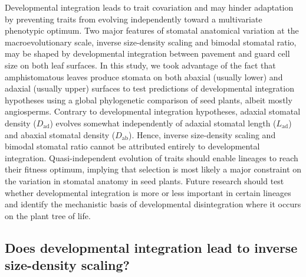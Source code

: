 \documentclass[
  10pt,
]{article}
\begin{document}
Developmental integration leads to trait covariation and may hinder adaptation by preventing traits from evolving independently toward a multivariate phenotypic optimum. Two major features of stomatal anatomical variation at the macroevolutionary scale, inverse size-density scaling and bimodal stomatal ratio, may be shaped by developmental integration between pavement and guard cell size on both leaf surfaces. In this study, we took advantage of the fact that amphistomatous leaves produce stomata on both abaxial (usually lower) and adaxial (usually upper) surfaces to test predictions of developmental integration hypotheses using a global phylogenetic comparison of seed plants, albeit mostly angiosperms. Contrary to developmental integration hypotheses, adaxial stomatal density (\(D_\text{ad}\)) evolves somewhat independently of adaxial stomatal length (\(L_\text{ad}\)) and abaxial stomatal density (\(D_\text{ab}\)). Hence, inverse size-density scaling and bimodal stomatal ratio cannot be attributed entirely to developmental integration. Quasi-independent evolution of traits should enable lineages to reach their fitness optimum, implying that selection is most likely a major constraint on the variation in stomatal anatomy in seed plants. Future research should test whether developmental integration is more or less important in certain lineages and identify the mechanistic basis of developmental disintegration where it occurs on the plant tree of life.

\hypertarget{does-developmental-integration-lead-to-inverse-size-density-scaling}{%
\subsection{Does developmental integration lead to inverse size-density scaling?}\label{does-developmental-integration-lead-to-inverse-size-density-scaling}}
\end{document}
